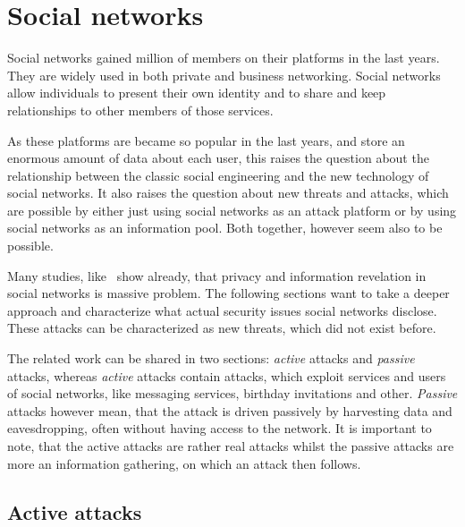 \section{Social networks}

Social networks gained million of members on their platforms in the last years.
They are widely used in both private and business networking. Social networks
allow individuals to present their own identity and to share and keep
relationships to other members of those services.

As these platforms are became so popular in the last years, and store an
enormous amount of data about each user, this raises the question about the
relationship between the classic social engineering and the new technology of
social networks. It also raises the question about new threats and attacks,
which are possible by either just using social networks as an attack platform
or by using social networks as an information pool. Both together, however seem
also to be possible.

Many studies, like~\cite{fraunhofer2008,gross2005} show already, that privacy
and information revelation in social networks is massive problem. The following
sections want to take a deeper approach and characterize what actual security
issues social networks disclose. These attacks can be characterized as new
threats, which did not exist before. 

The related work can be shared in two sections: \textit{active} attacks and
\textit{passive} attacks, whereas \textit{active} attacks contain attacks,
which exploit services and users of social networks, like messaging services,
birthday invitations and other.  \textit{Passive} attacks however mean, that
the attack is driven passively by harvesting data and eavesdropping, often
without having access to the network.  It is important to note, that the active
attacks are rather real attacks whilst the passive attacks are more an
information gathering, on which an attack then follows.

\subsection{Active attacks}
\label{subsection:active_attacks}

